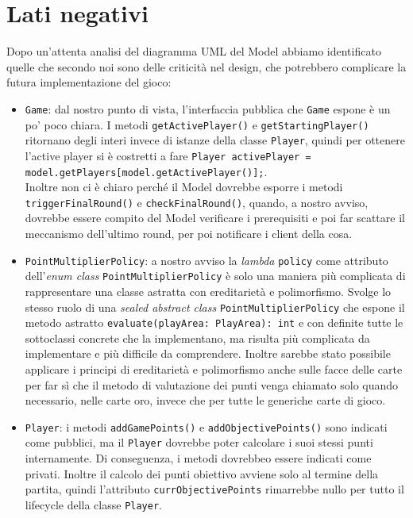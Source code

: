 \documentclass[12pt]{article}
\begin{document}
\section{Lati negativi}
%
%
Dopo un'attenta analisi del diagramma UML del Model abbiamo identificato quelle che secondo noi sono delle criticità nel design, che potrebbero complicare la futura implementazione del gioco:
\begin{itemize}
    \item \texttt{Game}: dal nostro punto di vista, l'interfaccia pubblica che \texttt{Game} espone è un po' poco chiara. I metodi \texttt{getActivePlayer()} e \texttt{getStartingPlayer()} ritornano degli interi invece di istanze della classe \texttt{Player}, quindi per ottenere l'active player si è costretti a fare \texttt{Player activePlayer = model.getPlayers[model.getActivePlayer()];}.\\Inoltre non ci è chiaro perché il Model dovrebbe esporre i metodi \texttt{triggerFinalRound()} e \texttt{checkFinalRound()}, quando, a nostro avviso, dovrebbe essere compito del Model verificare i prerequisiti e poi far scattare il meccanismo dell'ultimo round, per poi notificare i client della cosa.
    \item \texttt{PointMultiplierPolicy}: a nostro avviso la \textit{lambda} \texttt{policy} come attributo dell'\textit{enum class} \texttt{PointMultiplierPolicy} è solo una maniera più complicata di rappresentare una classe astratta con ereditarietà e polimorfismo. Svolge lo stesso ruolo di una \textit{sealed abstract class} \texttt{PointMultiplierPolicy} che espone il metodo astratto \texttt{evaluate(playArea: PlayArea): int} e con definite tutte le sottoclassi concrete che la implementano, ma risulta più complicata da implementare e più difficile da comprendere. Inoltre sarebbe stato possibile applicare i principi di ereditarietà e polimorfismo anche sulle facce delle carte per far sì che il metodo di valutazione dei punti venga chiamato solo quando necessario, nelle carte oro, invece che per tutte le generiche carte di gioco.
    \item \texttt{Player}: i metodi \texttt{addGamePoints()} e \texttt{addObjectivePoints()} sono indicati come pubblici, ma il \texttt{Player} dovrebbe poter calcolare i suoi stessi punti internamente. Di conseguenza, i metodi dovrebbeo essere indicati come privati. Inoltre il calcolo dei punti obiettivo avviene solo al termine della partita, quindi l'attributo \texttt{currObjectivePoints} rimarrebbe nullo per tutto il lifecycle della classe \texttt{Player}.

\end{itemize}
\end{document}
